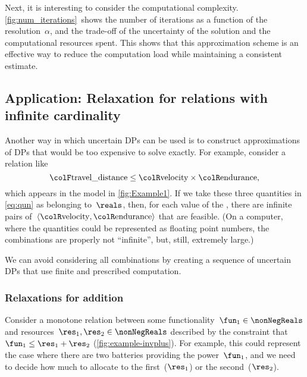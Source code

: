 Next, it is interesting to consider the computational complexity.
\cref{fig:num_iterations}~shows the number of iterations as
a function of the resolution~$\alpha$, and the trade-off of the
uncertainty of the solution and the computational resources spent.
This shows that this approximation scheme is an effective way to reduce
the computation load while maintaining a consistent estimate.

\subsection{Application: Relaxation for relations with infinite cardinality\label{sec:Application-relax}}

Another way in which uncertain DPs can be used is to construct approximations
of DPs that would be too expensive to solve exactly. For example,
consider a relation like
\begin{equation}
{\colF\text{travel\_distance}}
    \leq{\colR\text{velocity}}\times{\colR\text{endurance}},\label{eq:qun}
\end{equation}
which appears in the model in \cref{fig:Example1}. If we take
these three quantities in \cref{eq:qun} as belonging to~$\reals$,
then, for each value of the , there are infinite
pairs of~$\left\langle {\colR\text{velocity}},{\colR\text{endurance}}\right\rangle $
that are feasible. (On a computer, where the quantities could be represented
as floating point numbers, the combinations are properly not ``infinite'',
but, still, extremely large.)

We can avoid considering all combinations by creating a sequence of
uncertain DPs that use finite and prescribed computation.

\subsubsection{Relaxations for addition}

Consider a monotone relation between some functionality~$\fun_{1}\in\nonNegReals$
and resources~$\res_{1},\res_{2}\in\nonNegReals$ described by
the constraint that~$\fun_{1}\leq\res_{1}+\res_{2}$ (\cref{fig:example-invplus}).
For example, this could represent the case where there are two batteries
providing the power~$\fun_{1}$, and we need to decide how much to
allocate to the first~($\res_{1}$) or the second~($\res_{2}$).


